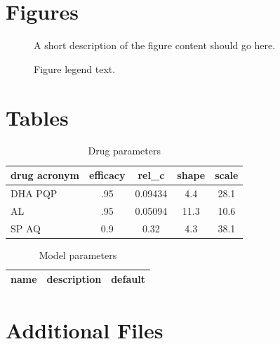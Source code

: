 \documentclass{bmcart}
\begin{document}
\begin{backmatter}

\section*{Figures}
  \begin{figure}[h!]
  \caption{
      A short description of the figure content
      should go here.}
      \end{figure}

\begin{figure}[h!]
  \caption{
      Figure legend text.}
      \end{figure}


\section*{Tables}
\begin{table}[h!]
\caption{Drug parameters}
      \begin{tabular}{l | cccc}
        \hline
        drug acronym & efficacy & rel\_c & shape & scale \\ \hline
        DHA PQP & .95 & 0.09434 & 4.4 & 28.1\\    
        AL & .95 & 0.05094 & 11.3 & 10.6\\
        SP AQ & 0.9 & 0.32 & 4.3 & 38.1\\ \hline
      \end{tabular}
\end{table}

\begin{table}[h!]
\caption{Model parameters}
      \begin{tabular}{l c | c}
        \hline
        name & description & default \\ \hline
      \end{tabular}
\end{table}


\section*{Additional Files}

\end{backmatter}
\end{document}
